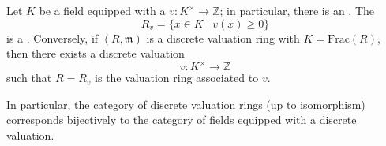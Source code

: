 
\begin{theorem} \label{theorem:correspondence_between_dvrs_and_discretely_valued_fields}
    Let $K$ be a field equipped with a  $v: K^\times \to \mathbb{Z}$; in particular, there is an . The 
    $$R_v = \{ x \in K \mid v(x) \geq 0 \}$$
    is a . Conversely, if $(R, \mathfrak{m})$ is a discrete valuation ring with  $K = \mathrm{Frac}(R)$, then there exists a discrete valuation
    $$v: K^\times \to \mathbb{Z}$$
    such that $R = R_v$ is the valuation ring associated to $v$.

    In particular, the category of discrete valuation rings (up to isomorphism) corresponds bijectively to the category of fields equipped with a discrete valuation.
\end{theorem}

